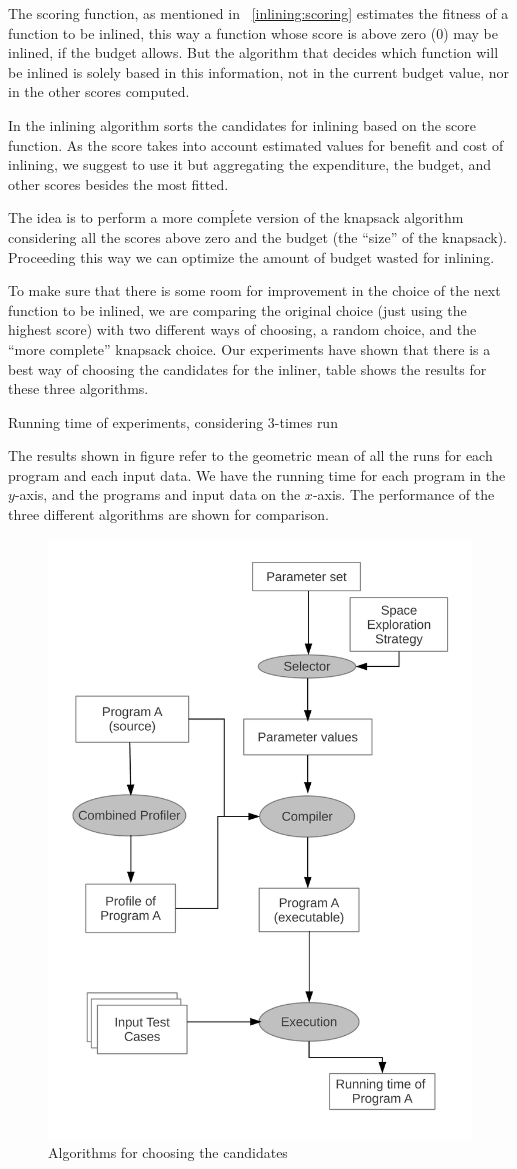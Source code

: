 
The scoring function, as mentioned in ~\ref{inlining:scoring} estimates the
fitness of a function to be inlined, this way a function whose score is above
zero ($0$) may be inlined, if the budget allows. But the algorithm that decides
which function will be inlined is solely based in this information, not in the
current budget value, nor in the other scores computed.

In \cite{BerubePhD} the inlining algorithm sorts the candidates for inlining
based on the score function. As the score takes into account estimated values for
benefit and cost of inlining, we suggest to use it but aggregating the expenditure,
the budget, and other scores besides the most fitted.

The idea is to perform a more compĺete version of the knapsack algorithm considering
all the scores above zero and the budget (the ``size'' of the knapsack). Proceeding
this way we can optimize the amount of budget wasted for inlining.

To make sure that there is some room for improvement in the choice of the next
function to be inlined, we are comparing the original choice (just using the highest
score) with two different ways of choosing, a random choice, and the ``more complete''
knapsack choice. Our experiments have shown that there is a best way of choosing the
candidates for the inliner, table  shows the results for these
three algorithms.

\begin{table}
  \centering
  \begin{tiny}
  
  \end{tiny}
  \caption{Running time of experiments, considering $3$-times run}
  \label{tab:choice}
\end{table}

The results shown in figure  refer to the geometric mean of all
the runs for each program and each input data. We have the running time for each program
in the $y$-axis, and the programs and input data on the $x$-axis. The performance of the
three different algorithms are shown for comparison.

\begin{figure}
  \centering
  \includegraphics[width=0.50\linewidth]{Figures/choice}
  \caption{Algorithms for choosing the candidates}
  \label{fig:choice}
\end{figure}
